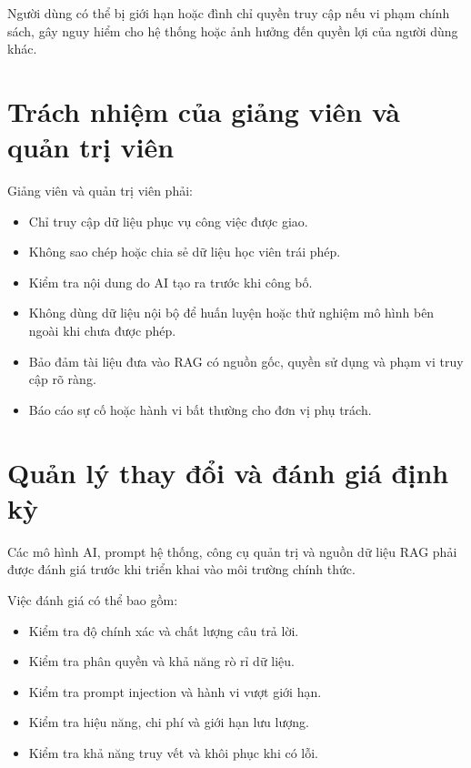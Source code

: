 \documentclass[12pt,a4paper]{article}
\begin{document}
Người dùng có thể bị giới hạn hoặc đình chỉ quyền truy cập nếu vi phạm chính sách,
gây nguy hiểm cho hệ thống hoặc ảnh hưởng đến quyền lợi của người dùng khác.

\section{Trách nhiệm của giảng viên và quản trị viên}

Giảng viên và quản trị viên phải:

\begin{itemize}
    \item Chỉ truy cập dữ liệu phục vụ công việc được giao.
    \item Không sao chép hoặc chia sẻ dữ liệu học viên trái phép.
    \item Kiểm tra nội dung do AI tạo ra trước khi công bố.
    \item Không dùng dữ liệu nội bộ để huấn luyện hoặc thử nghiệm mô hình bên ngoài khi chưa được phép.
    \item Bảo đảm tài liệu đưa vào RAG có nguồn gốc, quyền sử dụng và phạm vi truy cập rõ ràng.
    \item Báo cáo sự cố hoặc hành vi bất thường cho đơn vị phụ trách.
\end{itemize}

\section{Quản lý thay đổi và đánh giá định kỳ}

Các mô hình AI, prompt hệ thống, công cụ quản trị và nguồn dữ liệu RAG phải được
đánh giá trước khi triển khai vào môi trường chính thức.

Việc đánh giá có thể bao gồm:

\begin{itemize}
    \item Kiểm tra độ chính xác và chất lượng câu trả lời.
    \item Kiểm tra phân quyền và khả năng rò rỉ dữ liệu.
    \item Kiểm tra prompt injection và hành vi vượt giới hạn.
    \item Kiểm tra hiệu năng, chi phí và giới hạn lưu lượng.
    \item Kiểm tra khả năng truy vết và khôi phục khi có lỗi.
\end{itemize}
\end{document}
